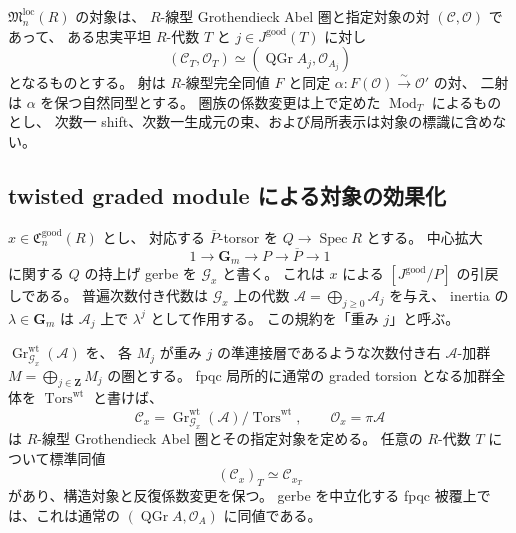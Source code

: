 \begin{definition}[局所一ブロック型の圏族]
\label{def:nfm-local-category}
$\mathfrak M_n^{\mathrm{loc}}(R)$ の対象は、
$R$-線型 Grothendieck Abel 圏と指定対象の対 $(\mathcal C,\mathcal O)$ であって、
ある忠実平坦 $R$-代数 $T$ と $j\in J^{\mathrm{good}}(T)$ に対し
\[
 (\mathcal C_T,\mathcal O_T)
 \simeq (\operatorname{QGr} A_j,\mathcal O_{A_j})
\]
となるものとする。
射は $R$-線型完全同値 $F$ と同定
$\alpha:F(\mathcal O)\xrightarrow{\sim}\mathcal O'$ の対、
二射は $\alpha$ を保つ自然同型とする。
圏族の係数変更は上で定めた $\operatorname{Mod}_T$ によるものとし、
次数一 shift、次数一生成元の束、および局所表示は対象の標識に含めない。
\end{definition}

\subsection{twisted graded module による対象の効果化}

$x\in\mathfrak C_n^{\mathrm{good}}(R)$ とし、
対応する $\overline P$-torsor を $Q\to\operatorname{Spec}R$ とする。
中心拡大
\[
 1\longrightarrow\mathbf G_m\longrightarrow P
 \longrightarrow\overline P\longrightarrow1
\]
に関する $Q$ の持上げ gerbe を $\mathcal G_x$ と書く。
これは $x$ による $[J^{\mathrm{good}}/P]$ の引戻しである。
普遍次数付き代数は $\mathcal G_x$ 上の代数
$\mathcal A=\bigoplus_{j\ge0}\mathcal A_j$ を与え、
inertia の $\lambda\in\mathbf G_m$ は $\mathcal A_j$ 上で $\lambda^j$ として作用する。
この規約を「重み $j$」と呼ぶ。

\begin{lemma}
\label{lem:nfm-weighted-tails}
$\operatorname{Gr}^{\mathrm{wt}}_{\mathcal G_x}(\mathcal A)$ を、
各 $M_j$ が重み $j$ の準連接層であるような次数付き右
$\mathcal A$-加群 $M=\bigoplus_{j\in\mathbf Z}M_j$ の圏とする。
fpqc 局所的に通常の graded torsion となる加群全体を
$\operatorname{Tors}^{\mathrm{wt}}$ と書けば、
\[
 \mathcal C_x=
 \operatorname{Gr}^{\mathrm{wt}}_{\mathcal G_x}(\mathcal A)
 /\operatorname{Tors}^{\mathrm{wt}},\qquad
 \mathcal O_x=\pi\mathcal A
\]
は $R$-線型 Grothendieck Abel 圏とその指定対象を定める。
任意の $R$-代数 $T$ について標準同値
\[
 (\mathcal C_x)_T\simeq\mathcal C_{x_T}
\]
があり、構造対象と反復係数変更を保つ。
gerbe を中立化する fpqc 被覆上では、これは通常の
$(\operatorname{QGr}A,\mathcal O_A)$ に同値である。
\end{lemma}

